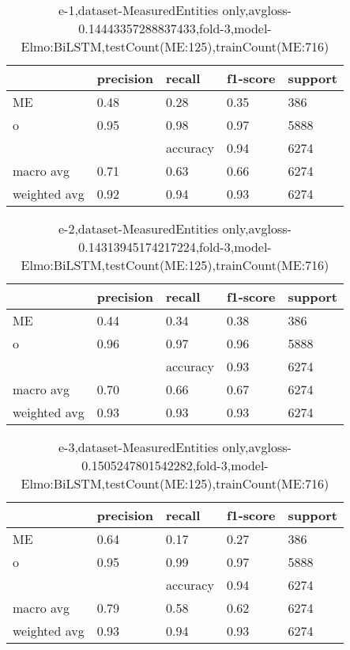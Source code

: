 \begin{table}[!ht] 
\centering
\caption{e-1,dataset-MeasuredEntities only,avgloss-0.14443357288837433,fold-3,model-Elmo:BiLSTM,testCount(ME:125),trainCount(ME:716)}\label{e-1data-meS.tsv}
\begin{tabularx}{300pt}{|X|X|X|X|X|}
\hline
&precision&recall&f1-score&support\\
\hline
ME&0.48&0.28&0.35&386\\
\hline
o&0.95&0.98&0.97&5888\\
\hline
&&accuracy&0.94&6274\\
\hline
macro avg&0.71&0.63&0.66&6274\\
\hline
weighted avg&0.92&0.94&0.93&6274\\
\hline
\end{tabularx}
\end{table}
\begin{table}[!ht] 
\centering
\caption{e-2,dataset-MeasuredEntities only,avgloss-0.14313945174217224,fold-3,model-Elmo:BiLSTM,testCount(ME:125),trainCount(ME:716)}\label{e-2data-meS.tsv}
\begin{tabularx}{300pt}{|X|X|X|X|X|}
\hline
&precision&recall&f1-score&support\\
\hline
ME&0.44&0.34&0.38&386\\
\hline
o&0.96&0.97&0.96&5888\\
\hline
&&accuracy&0.93&6274\\
\hline
macro avg&0.70&0.66&0.67&6274\\
\hline
weighted avg&0.93&0.93&0.93&6274\\
\hline
\end{tabularx}
\end{table}
\begin{table}[!ht] 
\centering
\caption{e-3,dataset-MeasuredEntities only,avgloss-0.1505247801542282,fold-3,model-Elmo:BiLSTM,testCount(ME:125),trainCount(ME:716)}\label{e-3data-meS.tsv}
\begin{tabularx}{300pt}{|X|X|X|X|X|}
\hline
&precision&recall&f1-score&support\\
\hline
ME&0.64&0.17&0.27&386\\
\hline
o&0.95&0.99&0.97&5888\\
\hline
&&accuracy&0.94&6274\\
\hline
macro avg&0.79&0.58&0.62&6274\\
\hline
weighted avg&0.93&0.94&0.93&6274\\
\hline
\end{tabularx}
\end{table}
